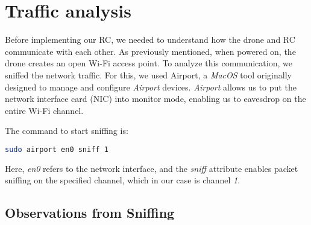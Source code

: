 \section{Traffic analysis}
Before implementing our RC, we needed to understand how the drone and RC communicate with each other. As previously mentioned, when powered on, the drone creates an open Wi-Fi access point. To analyze this communication, we sniffed the network traffic. For this, we used Airport, a \textit{MacOS} tool originally designed to manage and configure \textit{Airport} devices. \textit{Airport} allows us to put the network interface card (NIC) into monitor mode, enabling us to eavesdrop on the entire Wi-Fi channel.

The command to start sniffing is:
\begin{center}
    \begin{lstlisting}[language=bash]
        sudo airport en0 sniff 1
    \end{lstlisting}
\end{center}

Here, \textit{en0} refers to the network interface, and the \textit{sniff} attribute enables packet sniffing on the specified channel, which in our case is channel \textit{1}.

\subsection*{Observations from Sniffing}

